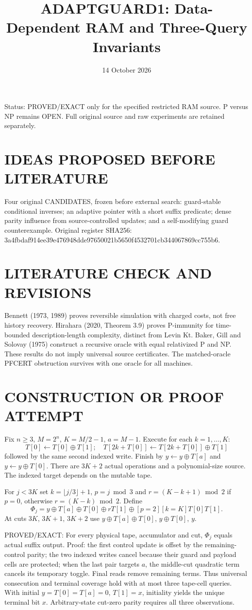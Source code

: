 \documentclass{article}
\title{ADAPTGUARD1: Data-Dependent RAM and Three-Query Invariants}
\date{14 October 2026}
\begin{document}
\maketitle
\noindent Status: PROVED/EXACT only for the specified restricted RAM source. P versus NP remains OPEN. Full original source and raw experiments are retained separately.

\section{IDEAS PROPOSED BEFORE LITERATURE}
Four original CANDIDATES, frozen before external search: guard-stable conditional inverses; an adaptive pointer with a short suffix predicate; dense parity influence from source-controlled updates; and a self-modifying guard counterexample. Original register SHA256: 3a4fbdaf914ee39e476948dde97650021b5650f4532701cb344067869cc755b6.

\section{LITERATURE CHECK AND REVISIONS}
Bennett (1973, 1989) proves reversible simulation with charged costs, not free history recovery. Hirahara (2020, Theorem 3.9) proves P-immunity for time-bounded description-length complexity, distinct from Levin Kt. Baker, Gill and Solovay (1975) construct a recursive oracle with equal relativized P and NP. These results do not imply universal source certificates. The matched-oracle PFCERT obstruction survives with one oracle for all machines.

\section{CONSTRUCTION OR PROOF ATTEMPT}
Fix $n\ge3$, $M=2^n$, $K=M/2-1$, $a=M-1$. Execute for each $k=1,\ldots,K$:
\[
 T[0]\gets T[0]\oplus T[1];\quad
 T[2k+T[0]]\gets T[2k+T[0]]\oplus T[1]
\]
followed by the same second indexed write. Finish by $y\gets y\oplus T[a]$ and $y\gets y\oplus T[0]$. There are $3K+2$ actual operations and a polynomial-size source. The indexed target depends on the mutable tape.

For $j<3K$ set $k=\lfloor j/3\rfloor+1$, $p=j\bmod3$ and $r=(K-k+1)\bmod2$ if $p=0$, otherwise $r=(K-k)\bmod2$. Define
\[
\Phi_j=y\oplus T[a]\oplus T[0]\oplus rT[1]
  \oplus[p=2][k=K]T[0]T[1].
\]
At cuts $3K$, $3K+1$, $3K+2$ use $y\oplus T[a]\oplus T[0]$, $y\oplus T[0]$, $y$.

\noindent PROVED/EXACT: For every physical tape, accumulator and cut, $\Phi_j$ equals actual suffix output. Proof: the first control update is offset by the remaining-control parity; the two indexed writes cancel because their guard and payload cells are protected; when the last pair targets $a$, the middle-cut quadratic term cancels its temporary toggle. Final reads remove remaining terms. Thus universal consecution and terminal coverage hold with at most three tape-cell queries. With initial $y=T[0]=T[a]=0$, $T[1]=x$, initiality yields the unique terminal bit $x$. Arbitrary-state cut-zero parity requires all three observations.
\end{document}
